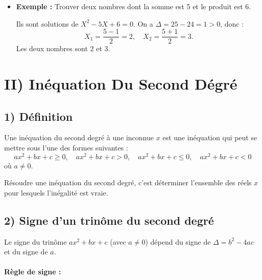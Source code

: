 \documentclass[12pt,a4paper]{article}
\newcounter{solution}
\begin{document}
\begin{itemize}
    \item \textbf{Exemple :} Trouver deux nombres dont la somme est 5 et le produit est 6.
    
    Ils sont solutions de $X^2 - 5X + 6 = 0$.
    On a $\Delta = 25 - 24 = 1 > 0$, donc :
    \[
    X_1 = \dfrac{5 - 1}{2} = 2, \quad X_2 = \dfrac{5 + 1}{2} = 3.
    \]
    Les deux nombres sont 2 et 3.
\end{itemize}

\section*{\color{myred} II) Inéquation Du Second Dégré}

\subsection*{\color{myred} 1) Définition}
Une inéquation du second degré à une inconnue $x$ est une inéquation qui peut se mettre sous l'une des formes suivantes :
\[
ax^2 + bx + c \geq 0, \quad ax^2 + bx + c > 0, \quad ax^2 + bx + c \leq 0, \quad ax^2 + bx + c < 0
\]
où $a \neq 0$.

Résoudre une inéquation du second degré, c'est déterminer l'ensemble des réels $x$ pour lesquels l'inégalité est vraie.

\subsection*{\color{myred} 2) Signe d'un trinôme du second degré}
Le signe du trinôme $ax^2 + bx + c$ (avec $a \neq 0$) dépend du signe de $\Delta = b^2 - 4ac$ et du signe de $a$.

\paragraph*{\color{myred} Règle de signe :}
\end{document}
